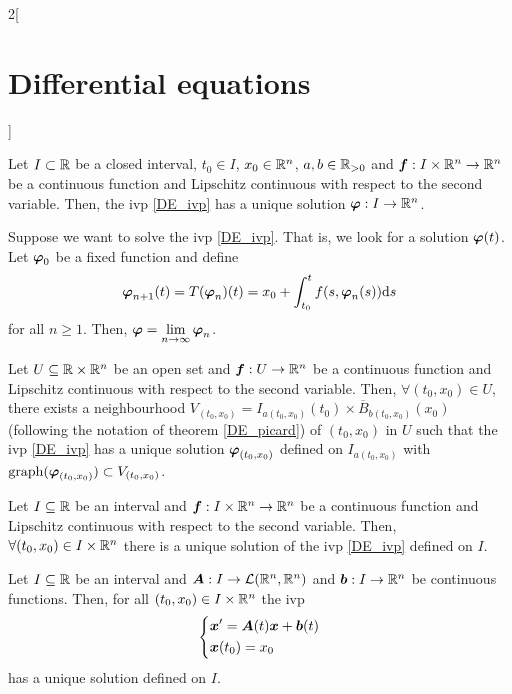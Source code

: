 \documentclass[../../../main.tex]{subfiles}
\begin{document}
\begin{multicols}{2}[\section{Differential equations}]
\begin{prop}
    Let $I\subset \mathbb{R}$ be a closed interval, $t_0\in I$, $x_0\in\mathbb{R}^n$, $a,b\in\mathbb{R}_{>0}$ and $\boldsymbol{f}:I\times\mathbb{R}^n\rightarrow\mathbb{R}^n$ be a continuous function and Lipschitz continuous with respect to the second variable. Then, the ivp \eqref{DE_ivp} has a unique solution $\boldsymbol{\varphi}:I\rightarrow\mathbb{R}^n$.
  \end{prop}
  \begin{corollary}
    Suppose we want to solve the ivp \eqref{DE_ivp}. That is, we look for a solution $\boldsymbol{\varphi}(t)$. Let $\boldsymbol{\varphi}_0$ be a fixed function and define
    $$\boldsymbol{\varphi}_{n+1}(t)=T(\boldsymbol{\varphi}_n)(t)=x_0+\int_{t_0}^tf(s,\boldsymbol{\varphi}_n(s))\dd s$$
    for all $n\geq 1$. Then, $\displaystyle\boldsymbol{\varphi}=\lim_{n\to\infty}\boldsymbol{\varphi}_n$.
  \end{corollary}
  \begin{corollary}
    Let $U\subseteq\mathbb{R}\times\mathbb{R}^n$ be an open set and $\boldsymbol{f}:U\rightarrow\mathbb{R}^n$ be a continuous function and Lipschitz continuous with respect to the second variable. Then, $\forall(t_0,x_0)\in U$, there exists a neighbourhood $V_{(t_0,x_0)}=I_{a(t_0,x_0)}(t_0)\times\overline{B}_{b(t_0,x_0)}(x_0)$ (following the notation of theorem \ref{DE_picard}) of $(t_0,x_0)$ in $U$ such that the ivp \eqref{DE_ivp} has a unique solution $\boldsymbol{\varphi}_{(t_0,x_0)}$ defined on $I_{a(t_0,x_0)}$ with $\operatorname{graph}(\boldsymbol{\varphi}_{(t_0,x_0)})\subset V_{(t_0,x_0)}$.
  \end{corollary}
  \begin{prop}
    Let $I\subseteq\mathbb{R}$ be an interval and $\boldsymbol{f}:I\times\mathbb{R}^n\rightarrow\mathbb{R}^n$ be a continuous function and Lipschitz continuous with respect to the second variable. Then, $\forall(t_0,x_0)\in I\times\mathbb{R}^n$ there is a unique solution of the ivp \eqref{DE_ivp} defined on $I$.
  \end{prop}
  \begin{corollary}
    Let $I\subseteq\mathbb{R}$ be an interval and $\boldsymbol{A}:I\rightarrow\mathcal{L}(\mathbb{R}^n,\mathbb{R}^n)$ and $\boldsymbol{b}:I\rightarrow\mathbb{R}^n$ be continuous functions. Then, for all $(t_0,x_0)\in I\times\mathbb{R}^n$ the ivp
    $$
      \left\{
      \begin{aligned}
         & \boldsymbol{x}'=\boldsymbol{A}(t)\boldsymbol{x}+\boldsymbol{b}(t) \\
         & \boldsymbol{x}(t_0)=x_0
      \end{aligned}
      \right.
    $$
    has a unique solution defined on $I$.
  \end{corollary}
\end{multicols}
\end{document}
